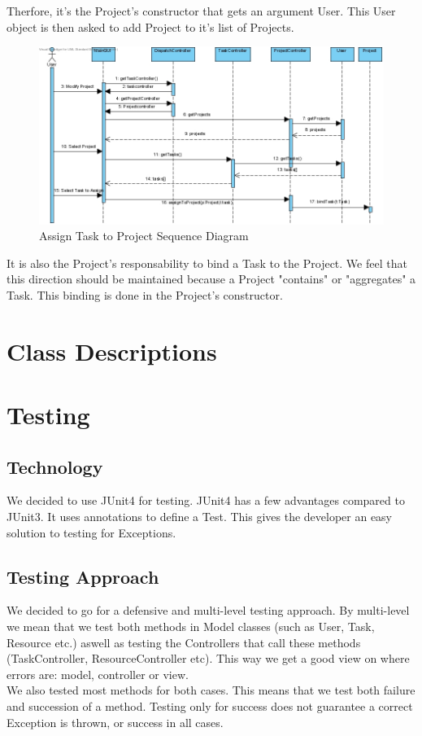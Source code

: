 \documentclass[a4paper,11pt]{article}
\begin{document}
			Therfore, it's the Project's constructor that gets an argument User. This User object is then asked to add Project to it's list of Projects.
			\begin{figure}[h!]
				\begin{center}
					\includegraphics[scale=0.5]{images/assign_task_to_project.jpg}
				\end{center}
				\caption{Assign Task to Project Sequence Diagram}
			\end{figure}
			It is also the Project's responsability to bind a Task to the Project. We feel that this direction should be maintained because a Project "contains" or "aggregates" a Task. This binding is done in the Project's constructor.			
			
	\section{Class Descriptions}
		
	\section{Testing}
		\subsection{Technology}
		We decided to use JUnit4 for testing.
		JUnit4 has a few advantages compared to JUnit3. It uses annotations to define a Test. This gives the developer an easy solution to testing for Exceptions.
		\subsection{Testing Approach}
		We decided to go for a defensive and multi-level testing approach.
		By multi-level we mean that we test both methods in Model classes (such as User, Task, Resource etc.) aswell as testing the Controllers that call these methods (TaskController, ResourceController etc). 
		This way we get a good view on where errors are: model, controller or view.\\
		We also tested most methods for both cases. This means that we test both failure and succession of a method. Testing only for success does not guarantee a correct Exception is thrown, or success in all cases.
\end{document}
